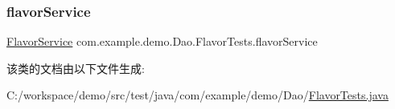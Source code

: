 \subsubsection{\texorpdfstring{flavor\+Service}{flavorService}}
{\footnotesize\ttfamily \mbox{\hyperlink{classcom_1_1example_1_1demo_1_1service_1_1_flavor_service}{Flavor\+Service}} com.\+example.\+demo.\+Dao.\+Flavor\+Tests.\+flavor\+Service\hspace{0.3cm}{\ttfamily [private]}}



该类的文档由以下文件生成\+:\begin{DoxyCompactItemize}
\item 
C\+:/workspace/demo/src/test/java/com/example/demo/\+Dao/\mbox{\hyperlink{_flavor_tests_8java}{Flavor\+Tests.\+java}}\end{DoxyCompactItemize}
